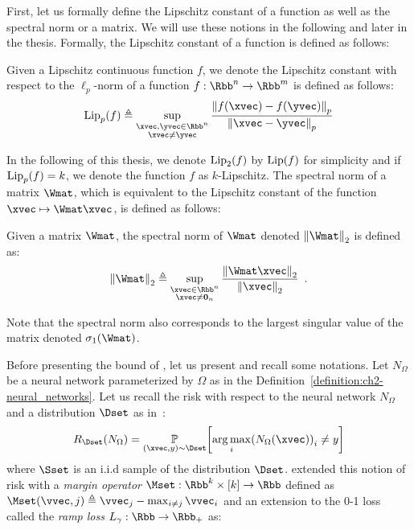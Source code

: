 First, let us formally define the Lipschitz constant of a function as well as the spectral norm or a matrix.
We will use these notions in the following and later in the thesis.
Formally, the Lipschitz constant of a function is defined as follows: 
\begin{definition} \label{definition:ch3-lipschitz_constant}
  Given a Lipschitz continuous function $f$, we denote the Lipschitz constant with respect to the $\ell_p$-norm of a function $f: \Rbb^n \rightarrow \Rbb^m$ is defined as follows:
  \begin{equation}
  \lipp{p}{f} \triangleq \sup_{\substack{\xvec, \yvec \in \Rbb^n \\ \xvec \neq \yvec}} \frac{\norm{f(\xvec) - f(\yvec)}_p}{\norm{\xvec - \yvec}_p}
  \end{equation}
  \removespace
\end{definition}
\noindent
In the following of this thesis, we denote $\lipp{2}{f}$ by $\lip{f}$ for simplicity and if $\lipp{p}{f}=k$, we denote the function $f$ as $k$-Lipschitz.
The spectral norm of a matrix $\Wmat$, which is equivalent to the Lipschitz constant of the function $\xvec \mapsto \Wmat \xvec$, is defined as follows:
\begin{definition} \label{defintion:ch2-spectral_norm}
Given a matrix $\Wmat$, the spectral norm of $\Wmat$ denoted $\norm{\Wmat}_2$ is defined as:
  \begin{equation}
    \norm{\Wmat}_2 \triangleq \sup_{\substack{\xvec \in \Rbb^n \\ \xvec \neq \zerovec{n}}} \frac{\norm{\Wmat \xvec}_2}{\norm{\xvec}_2} \enspace.
  \end{equation}
  \removespace
\end{definition}
\noindent
Note that the spectral norm also corresponds to the largest singular value of the matrix denoted $\sigma_1(\Wmat)$.

Before presenting the bound of \citet{bartlett2017spectrally}, let us present and recall some notations.
Let $N_\Omega$ be a neural network parameterized by $\Omega$ as in the Definition~\ref{definition:ch2-neural_networks}.
Let us recall the risk with respect to the neural network $N_\Omega$ and a distribution $\Dset$ as in~:
\begin{equation}
  R_\Dset(N_\Omega) = \Pbb_{(\xvec, y) \sim \Dset} \left[ \argmax_i \left( N_\Omega(\xvec) \right)_i \neq y \right]
\end{equation}
where $\Sset$ is an i.i.d sample of the distribution $\Dset$.
\citet{bartlett2017spectrally} extended this notion of risk with a \emph{margin operator} $\Mset: \Rbb^k \times [k] \rightarrow \Rbb$ defined as $\Mset(\vvec, j) \triangleq \vvec_j - \max_{i \neq j} \vvec_i$ and an extension to the 0-1 loss called the \emph{ramp loss} $L_\gamma: \Rbb \rightarrow \Rbb_+$ as:

